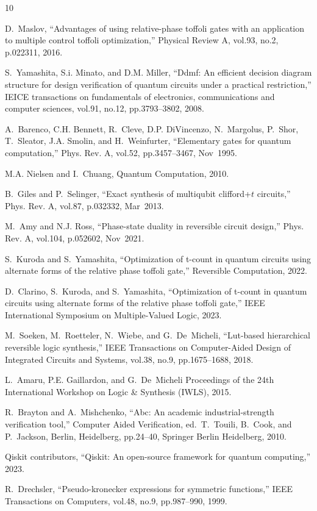 \documentclass[paper]{ieice}
\providecommand{\DIFdelbegin}{} %
\providecommand{\DIFdelend}{} %
\newcommand{\DIFscaledelfig}{0.5}
\newlength{\DIFdelgraphicswidth} %
\newlength{\DIFdelgraphicsheight} %
\newcommand{\DIFdelincludegraphics}[2][]{%
\sbox{\DIFdelgraphicsbox}{\DIFOincludegraphics[#1]{#2}}%
\settoboxwidth{\DIFdelgraphicswidth}{\DIFdelgraphicsbox} %
\settoboxtotalheight{\DIFdelgraphicsheight}{\DIFdelgraphicsbox} %
\scalebox{\DIFscaledelfig}{%
\parbox[b]{\DIFdelgraphicswidth}{\usebox{\DIFdelgraphicsbox}\\[-\baselineskip] \rule{\DIFdelgraphicswidth}{0em}}\llap{\resizebox{\DIFdelgraphicswidth}{\DIFdelgraphicsheight}{%
\setlength{\unitlength}{\DIFdelgraphicswidth}%
\begin{picture}(1,1)%
\thicklines\linethickness{2pt} %
{\color[rgb]{1,0,0}\put(0,0){\framebox(1,1){}}}%
{\color[rgb]{1,0,0}\put(0,0){\line( 1,1){1}}}%
{\color[rgb]{1,0,0}\put(0,1){\line(1,-1){1}}}%
\end{picture}%
}\hspace*{3pt}}} %
} %
\DeclareRobustCommand{\DIFdelbegin}{\DIFOdelbegin \let\includegraphics\DIFdelincludegraphics} %
\DeclareRobustCommand{\DIFdelend}{\DIFOaddend \let\includegraphics\DIFOincludegraphics} %
\begin{document}
\DIFdelbegin %
\DIFdelend %
\begin{thebibliography}{10}

D.~Maslov, ``Advantages of using relative-phase toffoli gates with an
  application to multiple control toffoli optimization,'' Physical Review A,
  vol.93, no.2, p.022311, 2016.

S.~Yamashita, S.i. Minato, and D.M. Miller, ``Ddmf: An efficient decision
  diagram structure for design verification of quantum circuits under a
  practical restriction,'' IEICE transactions on fundamentals of electronics,
  communications and computer sciences, vol.91, no.12, pp.3793--3802, 2008.

A.~Barenco, C.H. Bennett, R.~Cleve, D.P. DiVincenzo, N.~Margolus, P.~Shor,
  T.~Sleator, J.A. Smolin, and H.~Weinfurter, ``Elementary gates for quantum
  computation,'' Phys. Rev. A, vol.52, pp.3457--3467, Nov\ 1995.

M.A. Nielsen and I.~Chuang, Quantum Computation, 2010.

B.~Giles and P.~Selinger, ``Exact synthesis of multiqubit clifford+$t$
  circuits,'' Phys. Rev. A, vol.87, p.032332, Mar\ 2013.

M.~Amy and N.J. Ross, ``Phase-state duality in reversible circuit design,''
  Phys. Rev. A, vol.104, p.052602, Nov\ 2021.

S.~Kuroda and S.~Yamashita, ``Optimization of t-count in quantum circuits using
  alternate forms of the relative phase toffoli gate,'' Reversible Computation,
  2022.

D.~Clarino, S.~Kuroda, and S.~Yamashita, ``Optimization of t-count in quantum
  circuits using alternate forms of the relative phase toffoli gate,'' IEEE
  International Symposium on Multiple-Valued Logic, 2023.

M.~Soeken, M.~Roetteler, N.~Wiebe, and G.~De~Micheli, ``Lut-based hierarchical
  reversible logic synthesis,'' IEEE Transactions on Computer-Aided Design of
  Integrated Circuits and Systems, vol.38, no.9, pp.1675--1688, 2018.

L.~Amaru, P.E. Gaillardon, and G.~De~Micheli Proceedings of the 24th
  International Workshop on Logic \& Synthesis (IWLS), 2015.

R.~Brayton and A.~Mishchenko, ``Abc: An academic industrial-strength
  verification tool,'' Computer Aided Verification, ed.~T.~Touili, B.~Cook, and
  P.~Jackson, Berlin, Heidelberg, pp.24--40, Springer Berlin Heidelberg, 2010.

{Qiskit contributors}, ``Qiskit: An open-source framework for quantum
  computing,'' 2023.

R.~Drechsler, ``Pseudo-kronecker expressions for symmetric functions,'' IEEE
  Transactions on Computers, vol.48, no.9, pp.987--990, 1999.

\end{thebibliography}
%
\end{document}
